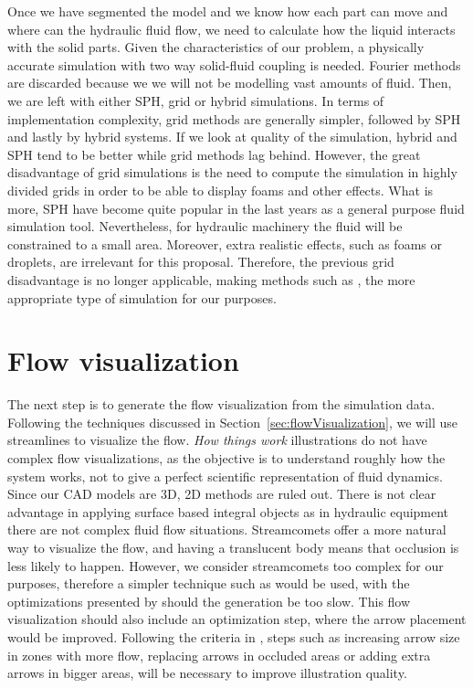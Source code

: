 Once we have segmented the model and we know how each part can move and where can the hydraulic fluid flow, we need to calculate how the liquid interacts with the solid parts.
Given the characteristics of our problem, a physically accurate simulation with two way solid-fluid coupling is needed.
Fourier methods are discarded because we we will not be modelling vast amounts of fluid.
Then, we are left with either SPH, grid or hybrid simulations.
In terms of implementation complexity, grid methods are generally simpler, followed by SPH and lastly by hybrid systems.
If we look at quality of the simulation, hybrid and SPH tend to be better while grid methods lag behind.
However, the great disadvantage of grid simulations is the need to compute the simulation in highly divided grids in order to be able to display foams and other effects.
What is more, SPH have become quite popular in the last years as a general purpose fluid simulation tool.
Nevertheless, for hydraulic machinery the fluid will be constrained to a small area.
Moreover, extra realistic effects, such as foams or droplets, are irrelevant for this proposal.
Therefore, the previous grid disadvantage is no longer applicable, making methods such as \cite{Carlson2004}, the more appropriate type of simulation for our purposes.


\section{Flow visualization}

The next step is to generate the flow visualization from the simulation data.
Following the techniques discussed in Section~\ref{sec:flowVisualization}, we will use streamlines to visualize the flow.
\textit{How things work} illustrations do not have complex flow visualizations, as the objective is to understand roughly how the system works, not to give a perfect scientific representation of fluid dynamics.
Since our CAD models are 3D, 2D methods are ruled out.
There is not clear advantage in applying surface based integral objects as in hydraulic equipment there are not complex fluid flow situations.
Streamcomets offer a more natural way to visualize the flow, and having a translucent body means that occlusion is less likely to happen.
However, we consider streamcomets too complex for our purposes, therefore a simpler technique such as \cite{Wicke2009} would be used, with the optimizations presented by \cite{McLoughlin2013} should the generation be too slow.
This flow visualization should also include an optimization step, where the arrow placement would be improved.
Following the criteria in \cite{Mitra2010}, steps such as increasing arrow size in zones with more flow, replacing arrows in occluded areas or adding extra arrows in bigger areas, will be necessary to improve illustration quality.

